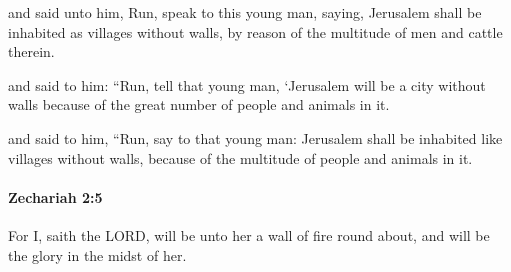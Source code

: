 			\begin{versebox}
					\item[BHS] 
					\item[LXX] 
					\item[ASV] and said unto him, Run, speak to this young man, saying, Jerusalem shall be inhabited as villages without walls, by reason of the multitude of men and cattle therein.
					\item[NIV] and said to him: “Run, tell that young man, ‘Jerusalem will be a city without walls because of the great number of people and animals in it.
					\item[NRSV] and said to him, “Run, say to that young man: Jerusalem shall be inhabited like villages without walls, because of the multitude of people and animals in it.
			\end{versebox}

		\paragraph{Zechariah 2:5} %
			\label{ZECHARIAH-2-5}

			For I, saith the LORD, will be unto her a wall of fire round about, and will be the glory in the midst of her.

